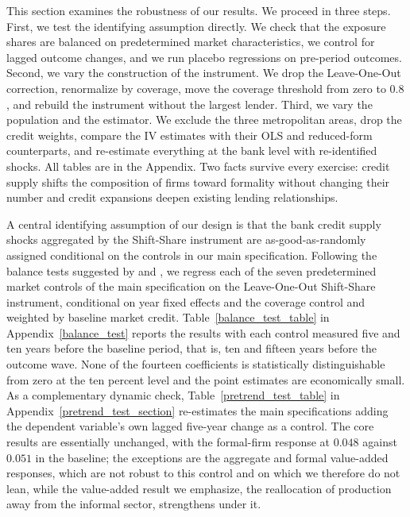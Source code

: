 \documentclass[12pt]{article}
\begin{document}
This section examines the robustness of our results. We proceed in three steps. First, we test the identifying assumption directly. We check that the exposure shares are balanced on predetermined market characteristics, we control for lagged outcome changes, and we run placebo regressions on pre-period outcomes. Second, we vary the construction of the instrument. We drop the Leave-One-Out correction, renormalize by coverage, move the coverage threshold from zero to $0.8$, and rebuild the instrument without the largest lender. Third, we vary the population and the estimator. We exclude the three metropolitan areas, drop the credit weights, compare the IV estimates with their OLS and reduced-form counterparts, and re-estimate everything at the bank level with re-identified shocks. All tables are in the Appendix. Two facts survive every exercise: credit supply shifts the composition of firms toward formality without changing their number and credit expansions deepen existing lending relationships.

A central identifying assumption of our design is that the bank credit supply shocks aggregated by the Shift-Share instrument are as-good-as-randomly assigned conditional on the controls in our main specification. Following the balance tests suggested by \citet{borusyak2022quasi} and \citet{goldsmith2020bartik}, we regress each of the seven predetermined market controls of the main specification on the Leave-One-Out Shift-Share instrument, conditional on year fixed effects and the coverage control and weighted by baseline market credit. Table~\ref{balance_test_table} in Appendix~\ref{balance_test} reports the results with each control measured five and ten years before the baseline period, that is, ten and fifteen years before the outcome wave. None of the fourteen coefficients is statistically distinguishable from zero at the ten percent level and the point estimates are economically small. As a complementary dynamic check, Table~\ref{pretrend_test_table} in Appendix~\ref{pretrend_test_section} re-estimates the main specifications adding the dependent variable's own lagged five-year change as a control. The core results are essentially unchanged, with the formal-firm response at $0.048$ against $0.051$ in the baseline; the exceptions are the aggregate and formal value-added responses, which are not robust to this control and on which we therefore do not lean, while the value-added result we emphasize, the reallocation of production away from the informal sector, strengthens under it.
\end{document}
